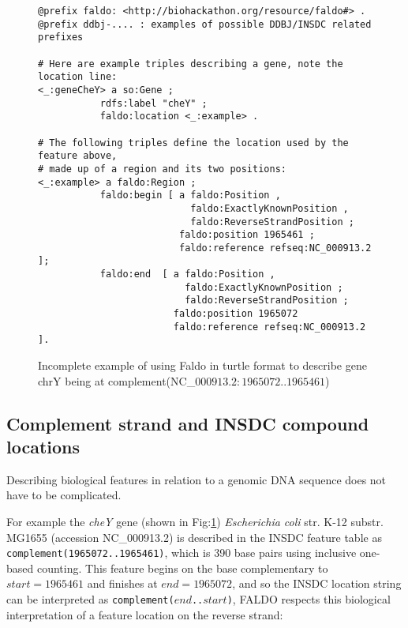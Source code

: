 %
\begin{figure}
\begin{shaded}
\small
\begin{verbatim} 
@prefix faldo: <http://biohackathon.org/resource/faldo#> .
@prefix ddbj-.... : examples of possible DDBJ/INSDC related prefixes

# Here are example triples describing a gene, note the location line:
<_:geneCheY> a so:Gene ;
           rdfs:label "cheY" ;
           faldo:location <_:example> .

# The following triples define the location used by the feature above,
# made up of a region and its two positions:
<_:example> a faldo:Region ;
           faldo:begin [ a faldo:Position ,
                           faldo:ExactlyKnownPosition ,
                           faldo:ReverseStrandPosition ;
                         faldo:position 1965461 ;
                         faldo:reference refseq:NC_000913.2 ];
           faldo:end  [ a faldo:Position ,
                          faldo:ExactlyKnownPosition ;
                          faldo:ReverseStrandPosition ;
                        faldo:position 1965072
                        faldo:reference refseq:NC_000913.2 ].
\end{verbatim}
\end{shaded}
\caption{Incomplete example of using Faldo in turtle format to describe
gene chrY being at complement(NC\_$000913.2:1965072..1965461$)}
\label{fig:insdcComplement}
\end{figure}


\subsection*{Complement strand and INSDC compound locations}

Describing biological features in relation to a genomic DNA sequence does not have to be complicated.

For example the \textit{cheY} gene (shown in Fig:\ref{fig:insdcComplement}) 
\textit{Escherichia coli} str. K-12 substr. MG1655 (accession NC\_000913.2)
is described in the INSDC feature table as \texttt{complement(1965072..1965461)},
which is 390 base pairs using inclusive one-based counting.
This feature begins on the base complementary to $start = 1965461$
and finishes at $end = 1965072$, and so the INSDC location string
can be interpreted as \texttt{complement($end$..$start$)},
FALDO respects this biological interpretation of a feature location
on the reverse strand:

